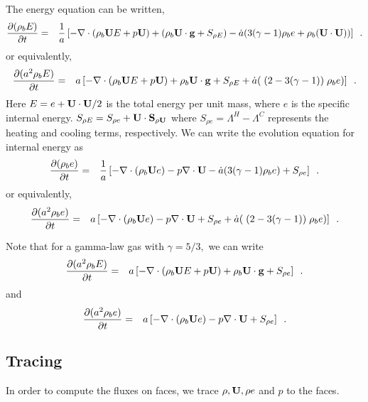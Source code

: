 The energy equation can be written,
\begin{eqnarray}
\frac{\partial (\rho_b E)}{\partial t} &=& \frac{1}{a} \left[
- \nabla \cdot (\rho_b {\bf U} E + p {\bf U})
+ ( \rho_b {\bf U} \cdot {\bf g} +  S_{\rho E} ) 
- \dot{a} ( 3 (\gamma - 1) \rho_b e + \rho_b ( {\bf U} \cdot {\bf U}) ) \right] \enskip . 
\end{eqnarray}
or equivalently,
\begin{eqnarray}
\label{eq:energy}
\frac{\partial (a^2 \rho_b E)}{\partial t} &=& a \left[
- \nabla \cdot (\rho_b {\bf U} E + p {\bf U})
+  \rho_b {\bf U} \cdot {\bf g} 
+  S_{\rho E}  
+  \dot{a} ( \; ( 2 - 3 (\gamma - 1) ) \; \rho_b e ) \right] \enskip . 
\end{eqnarray}
Here $E = e + {\bf U} \cdot {\bf U} / 2$ is the total energy per unit mass, 
where $e$ is the specific internal energy.  
$S_{\rho E} = S_{\rho e} + {\bf U} \cdot {\bf S}_{\rho {\bf U}}$
where $S_{\rho e} = \Lambda^H - \Lambda^C$ represents the heating and cooling terms, respectively.
We can write the evolution equation for internal energy as
\begin{eqnarray}
\frac{\partial (\rho_b e)}{\partial t} &=& \frac{1}{a} \left[
- \nabla \cdot (\rho_b {\bf U} e)
- p \nabla \cdot {\bf U}
- \dot{a} ( 3 (\gamma - 1) \rho_b e )
+ S_{\rho e}  \right] \enskip . 
\end{eqnarray}
or equivalently,
\begin{eqnarray}
\frac{\partial (a^2 \rho_b e)}{\partial t} &=&  a \left[
- \nabla \cdot (\rho_b {\bf U} e)
- p \nabla \cdot {\bf U}
+ S_{\rho e} 
+ \dot{a} ( \; ( 2 - 3 (\gamma - 1) ) \; \rho_b e ) \right] \enskip . 
\end{eqnarray}

Note that for a gamma-law gas with $\gamma = 5/3,$ we can write
\begin{eqnarray}
\frac{\partial (a^2 \rho_b E)}{\partial t} &=&  a \left[
 -\nabla \cdot (\rho_b {\bf U} E + p {\bf U})
+  \rho_b {\bf U} \cdot {\bf g} 
+  S_{\rho e}  \right]  \enskip . 
\end{eqnarray}
and
\begin{eqnarray}
\frac{\partial (a^2 \rho_b e)}{\partial t} &=& a \left[ 
- \nabla \cdot (\rho_b {\bf U} e)
-  p \nabla \cdot {\bf U}
+  S_{\rho e}  \right]  \enskip . 
\end{eqnarray}

\subsection{Tracing}

In order to compute the fluxes on faces, we trace $\rho, {\bf U}, \rho e$ and $p$ to the faces.

